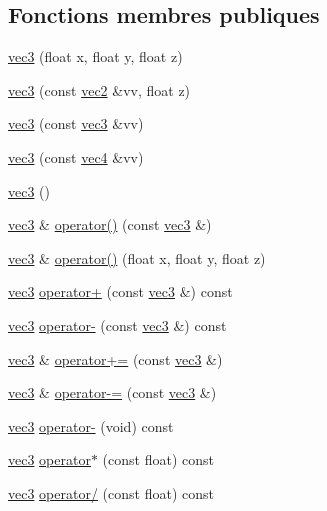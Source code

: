 \subsection*{Fonctions membres publiques}
\begin{DoxyCompactItemize}
\item 
\hyperlink{structvec3_a0c11a1f6ed4c349713657dd3452d6ea3}{vec3} (float x, float y, float z)
\item 
\hyperlink{structvec3_a0be4c6cdf0d0075143c7f002afbd9197}{vec3} (const \hyperlink{structvec2}{vec2} \&vv, float z)
\item 
\hyperlink{structvec3_ad4c53c507779713af6bc2f47d60b458e}{vec3} (const \hyperlink{structvec3}{vec3} \&vv)
\item 
\hyperlink{structvec3_ae8b2e6ef16b18f03756310a5ef9eb558}{vec3} (const \hyperlink{structvec4}{vec4} \&vv)
\item 
\hyperlink{structvec3_aea9f3480a6ccd7ce3ab02d0992705d33}{vec3} ()
\item 
\hyperlink{structvec3}{vec3} \& \hyperlink{structvec3_ae5c4f205385ed5c1497343ca91f34874}{operator()} (const \hyperlink{structvec3}{vec3} \&)
\item 
\hyperlink{structvec3}{vec3} \& \hyperlink{structvec3_adcc8c74d2a6bec1f2f8ce16779b511e1}{operator()} (float x, float y, float z)
\item 
\hyperlink{structvec3}{vec3} \hyperlink{structvec3_a3d8a20b779705b215e7cdcba780c8e70}{operator+} (const \hyperlink{structvec3}{vec3} \&) const 
\item 
\hyperlink{structvec3}{vec3} \hyperlink{structvec3_a3bd4baa92fdd2e08e0852eb1bbc80e58}{operator-\/} (const \hyperlink{structvec3}{vec3} \&) const 
\item 
\hyperlink{structvec3}{vec3} \& \hyperlink{structvec3_a35d8a4bfa8ea867ad4810674de7b43a4}{operator+=} (const \hyperlink{structvec3}{vec3} \&)
\item 
\hyperlink{structvec3}{vec3} \& \hyperlink{structvec3_a16a563beee180c1760a9c9cac25cecfc}{operator-\/=} (const \hyperlink{structvec3}{vec3} \&)
\item 
\hyperlink{structvec3}{vec3} \hyperlink{structvec3_ac0a865f4af52c9cb5f5dec837bccf0bd}{operator-\/} (void) const 
\item 
\hyperlink{structvec3}{vec3} \hyperlink{structvec3_a1ed5889d7f706e1dd8111546e19e5171}{operator$\ast$} (const float) const 
\item 
\hyperlink{structvec3}{vec3} \hyperlink{structvec3_a3f506aaaea420b751e6928e2d080fa2d}{operator/} (const float) const 

\end{DoxyCompactItemize}
